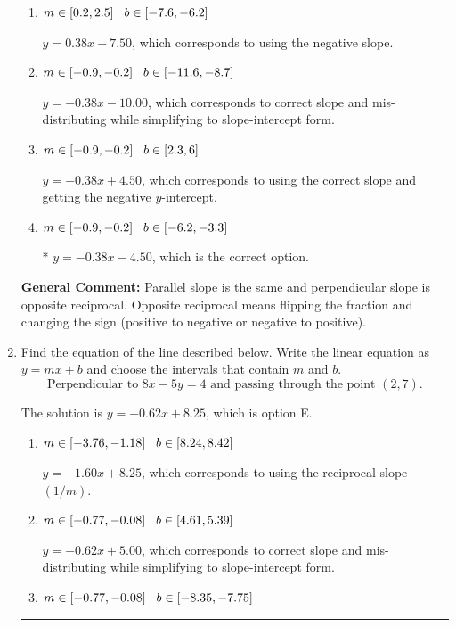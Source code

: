 \documentclass{extbook}[14pt]
\newcommand{\litem}[1]{\item #1

\rule{\textwidth}{0.4pt}}
\begin{document}
\begin{enumerate}
{\begin{enumerate}[label=\Alph*.]
 $y = -2.67x - 4.50$, which corresponds to using the reciprocal slope $(1/m)$.
\item \( m \in [0.2, 2.5] \hspace*{3mm} b \in [-7.6, -6.2] \)

 $y = 0.38x - 7.50$, which corresponds to using the negative slope.
\item \( m \in [-0.9, -0.2] \hspace*{3mm} b \in [-11.6, -8.7] \)

 $y = -0.38x - 10.00$, which corresponds to correct slope and mis-distributing while simplifying to slope-intercept form.
\item \( m \in [-0.9, -0.2] \hspace*{3mm} b \in [2.3, 6] \)

 $y = -0.38x + 4.50$, which corresponds to using the correct slope and getting the negative $y$-intercept.
\item \( m \in [-0.9, -0.2] \hspace*{3mm} b \in [-6.2, -3.3] \)

* $y = -0.38x - 4.50$, which is the correct option.
\end{enumerate}

\textbf{General Comment:} Parallel slope is the same and perpendicular slope is opposite reciprocal. Opposite reciprocal means flipping the fraction and changing the sign (positive to negative or negative to positive).
}
\litem{
Find the equation of the line described below. Write the linear equation as $ y=mx+b $ and choose the intervals that contain $m$ and $b$.
\[ \text{Perpendicular to } 8 x - 5 y = 4 \text{ and passing through the point } (2, 7). \]

The solution is \( y = -0.62x + 8.25 \), which is option E.\begin{enumerate}[label=\Alph*.]
\item \( m \in [-3.76, -1.18] \hspace*{3mm} b \in [8.24, 8.42] \)

 $y = -1.60x + 8.25$, which corresponds to using the reciprocal slope $(1/m)$.
\item \( m \in [-0.77, -0.08] \hspace*{3mm} b \in [4.61, 5.39] \)

 $y = -0.62x + 5.00$, which corresponds to correct slope and mis-distributing while simplifying to slope-intercept form.
\item \( m \in [-0.77, -0.08] \hspace*{3mm} b \in [-8.35, -7.75] \)


\end{enumerate}}
\end{enumerate}
\end{document}
